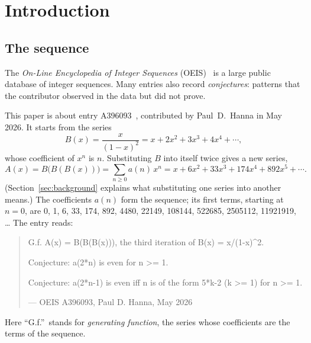 \documentclass[11pt,a4paper]{article}
\theoremstyle{definition}
\theoremstyle{remark}
\begin{document}
\section{Introduction}

\subsection{The sequence}\label{sec:sequence}
The \emph{On-Line Encyclopedia of Integer Sequences} (OEIS)~\cite{oeisdb} is a large public database of integer
sequences. Many
entries also record \emph{conjectures}: patterns that the contributor observed in the data but did not prove.

This paper is about entry A396093~\cite{oeis}, contributed by Paul~D.~Hanna in May 2026. It starts from the series
\[
B(x)=\frac{x}{(1-x)^2}=x+2x^2+3x^3+4x^4+\cdots,
\]
whose coefficient of $x^n$ is $n$. Substituting $B$ into itself twice gives a new series,
\[
A(x)=B\bigl(B(B(x))\bigr)=\sum_{n\ge0}a(n)\,x^n=x+6x^2+33x^3+174x^4+892x^5+\cdots .
\]
(Section~\ref{sec:background} explains what substituting one series into another means.) The coefficients $a(n)$ form
the sequence; its first terms, starting at $n=0$, are 0, 1, 6, 33, 174, 892, 4480, 22149, 108144, 522685, 2505112, 11921919, \dots{} The entry reads:
\begin{quote}\small\ttfamily\raggedright G.f. A(x) = B(B(B(x))), the third iteration of B(x) = x/(1-x)\^{}2.\par\smallskip Conjecture: a(2*n) is even for n >= 1.\par\smallskip Conjecture: a(2*n-1) is even iff n is of the form 5*k-2 (k >= 1) for n >= 1.\par\smallskip\hfill\textrm{--- OEIS A396093, Paul D. Hanna, May 2026}\end{quote}

Here ``G.f.''\ stands for \emph{generating function}, the series whose coefficients are the terms of the sequence.
\end{document}

